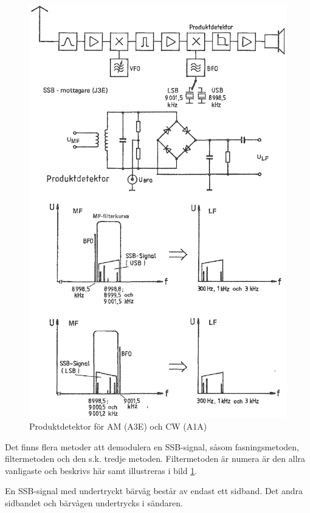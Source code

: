 \begin{figure}
\includegraphics[width=\textwidth]{images/cropped_pdfs/bild_2_3-56.pdf}
\caption{Produktdetektor för AM (A3E) och CW (A1A)}
\label{fig:BildII3-56}
\end{figure}

Det finns flera metoder att demodulera en SSB-signal, såsom fasningsmetoden,
filtermetoden och den s.k. tredje metoden.
Filtermetoden är numera är den allra vanligaste och beskrivs här samt
illustreras i bild \ref{fig:BildII3-56}.

En SSB-signal med undertryckt bärvåg består av endast ett sidband.
Det andra sidbandet och bärvågen undertrycks i sändaren.

